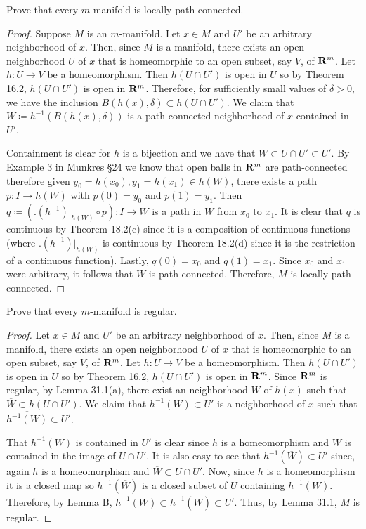 \newpage
\begin{problem}[(A)]
Prove that every $m$-manifold is locally path-connected.
\end{problem}
\begin{proof}
Suppose $M$ is an $m$-manifold. Let $x\in M$ and $U'$ be an arbitrary
neighborhood of $x$. Then, since $M$ is a manifold, there exists an open
neighborhood $U$ of $x$ that is homeomorphic to an open subset, say $V$, of
$\mathbf{R}^m$. Let $h\colon U\to V$ be a homeomorphism. Then $h(U\cap U')$ is
open in $U$ so by Theorem 16.2, $h(U\cap U')$ is open in
$\mathbf{R}^m$. Therefore, for sufficiently small values of $\delta>0$, we have
the inclusion $B(h(x),\delta)\subset h(U\cap U')$. We claim that
$W\coloneqq h^{-1}(B(h(x),\delta))$ is a path-connected neighborhood of $x$
contained in $U'$.

Containment is clear for $h$ is a bijection and we have that $W\subset
U\cap U'\subset U'$. By Example 3 in Munkres \S24 we know that open balls
in $\mathbf{R}^m$ are path-connected therefore given $y_0=h(x_0),y_1=h(x_1)\in
h(W)$, there exists a path $p\colon I\to h(W)$ with $p(0)=y_0$ and
$p(1)=y_1$. Then $q\coloneqq \left(\bigl.(h^{-1})\bigr|_{h(W)}\circ
  p\right)\colon I\to W$ is a path in $W$ from $x_0$ to $x_1$. It is clear
that $q$ is continuous by Theorem 18.2(c) since it is a composition of
continuous functions (where $\bigl.(h^{-1})\bigr|_{h(W)}$ is continuous by
Theorem 18.2(d) since it is the restriction of a continuous
function). Lastly, $q(0)=x_0$ and $q(1)=x_1$. Since $x_0$ and $x_1$ were
arbitrary, it follows that $W$ is path-connected. Therefore, $M$ is locally
path-connected.
\end{proof}
\newpage
\begin{problem}[(B)]
Prove that every $m$-manifold is regular.
\end{problem}
\begin{proof}
Let $x\in M$ and $U'$ be an arbitrary
neighborhood of $x$. Then, since $M$ is a manifold, there exists an open
neighborhood $U$ of $x$ that is homeomorphic to an open subset, say $V$, of
$\mathbf{R}^m$. Let $h\colon U\to V$ be a homeomorphism. Then $h(U\cap U')$ is
open in $U$ so by Theorem 16.2, $h(U\cap U')$ is open in
$\mathbf{R}^m$. Since $\mathbf{R}^m$ is regular, by Lemma 31.1(a), there exist an
neighborhood $W$ of $h(x)$ such that $\overline W\subset h(U\cap U')$. We
claim that $h^{-1}(W)\subset U'$ is a neighborhood of $x$ such
that $\overline{h^{-1}(W)}\subset U'$.

That $h^{-1}(W)$ is contained in $U'$ is clear since $h$ is a
homeomorphism and $W$ is contained in the image of $U\cap U'$. It is also
easy to see that $h^{-1}(\overline{W})\subset U'$ since, again $h$ is a
homeomorphism and $\overline W\subset U\cap U'$. Now, since $h$ is a
homeomorphism it is a closed map so $h^{-1}(\overline W)$ is a closed
subset of $U$ containing $h^{-1}(W)$. Therefore, by Lemma B,
$\overline{h^{-1}(W)}\subset h^{-1}(\overline{W})\subset U'$. Thus, by
Lemma 31.1, $M$ is regular.
\end{proof}
